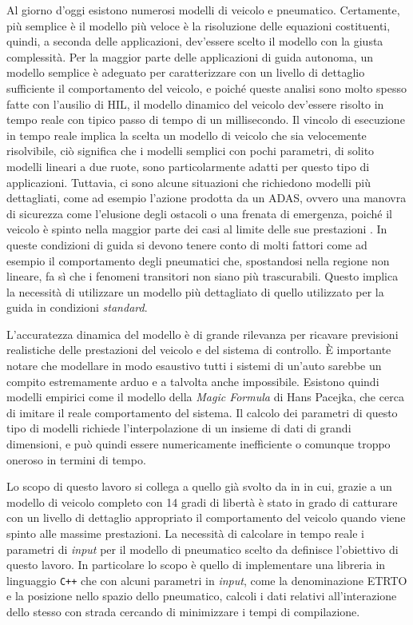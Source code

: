 Al giorno d'oggi esistono numerosi modelli di veicolo e pneumatico. Certamente, più semplice è il modello più veloce è la risoluzione delle equazioni costituenti, quindi, a seconda delle applicazioni, dev'essere scelto il modello con la giusta complessità. Per la maggior parte delle applicazioni di guida autonoma, un modello semplice è adeguato per caratterizzare con un livello di dettaglio sufficiente il comportamento del veicolo, e poiché queste analisi sono molto spesso fatte con l'ausilio di \ac{HIL}, il modello dinamico del veicolo dev'essere risolto in tempo reale con tipico passo di tempo di un millisecondo. Il vincolo di esecuzione in tempo reale implica la scelta un modello di veicolo che sia velocemente risolvibile, ciò significa che i modelli semplici con pochi parametri, di solito modelli lineari a due ruote, sono particolarmente adatti per questo tipo di applicazioni. Tuttavia, ci sono alcune situazioni che richiedono modelli più dettagliati, come ad esempio l'azione prodotta da un \ac{ADAS}, ovvero una manovra di sicurezza come l'elusione degli ostacoli o una frenata di emergenza, poiché il veicolo è spinto nella maggior parte dei casi al limite delle sue prestazioni \cite{impacts}. In queste condizioni di guida si devono tenere conto di molti fattori come ad esempio il comportamento degli pneumatici che, spostandosi nella regione non lineare, fa sì che i fenomeni transitori non siano più trascurabili. Questo implica la necessità di utilizzare un modello più dettagliato di quello utilizzato per la guida in condizioni \textit{standard}.

L'accuratezza dinamica del modello è di grande rilevanza per ricavare previsioni realistiche delle prestazioni del veicolo e del sistema di controllo. È importante notare che modellare in modo esaustivo tutti i sistemi di un'auto sarebbe un compito estremamente arduo e a talvolta anche impossibile. Esistono quindi modelli empirici come il modello della \textit{Magic Formula} di Hans Pacejka, che cerca di imitare il reale comportamento del sistema. Il calcolo dei parametri di questo tipo di modelli richiede l'interpolazione di un insieme di dati di grandi dimensioni, e può quindi essere numericamente inefficiente o comunque troppo oneroso in termini di tempo.

Lo scopo di questo lavoro si collega a quello già svolto da \citeauthor{Larcher} in \cite{Larcher} in cui, grazie a un modello di veicolo completo con 14 gradi di libertà è stato in grado di catturare con un livello di dettaglio appropriato il comportamento del veicolo quando viene spinto alle massime prestazioni. La necessità di calcolare in tempo reale i parametri di \textit{input} per il modello di pneumatico scelto da \cite{Larcher} definisce l'obiettivo di questo lavoro. In particolare lo scopo è quello di implementare una libreria in linguaggio \texttt{C++} che con alcuni parametri in \textit{input}, come la denominazione \ac{ETRTO} e la posizione nello spazio dello pneumatico, calcoli i dati relativi all'interazione dello stesso con strada cercando di minimizzare i tempi di compilazione.